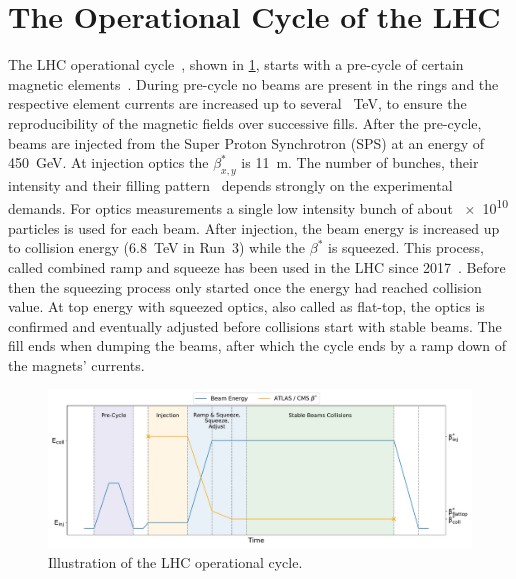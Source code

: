 
\section{The Operational Cycle of the LHC}
\label{section:lhc_operational_cycle}

The LHC operational cycle~\cite{Report:LHCModes}, shown in \cref{figure:lhc_cycle}, starts with a pre-cycle of certain magnetic elements~\cite{Report:LHCMagnetsPreCycles}.
During pre-cycle no beams are present in the rings and the respective element currents are increased up to several \qty{}{\tera\electronvolt}, to ensure the reproducibility of the magnetic fields over successive fills.
After the pre-cycle, beams are injected from the Super Proton Synchrotron (SPS) at an energy of \qty{450}{\giga\electronvolt}.
At injection optics the \(\beta^{\ast}_{x,y}\) is \qty{11}{\metre}.
The number of bunches, their intensity and their filling pattern~\cite{Report:LHCStandardFillingSchemes} depends strongly on the experimental demands.
For optics measurements a single low intensity bunch of about \num{e10} particles is used for each beam.
After injection, the beam energy is increased up to collision energy (\qty{6.8}{\tera\electronvolt} in Run~3) while the \(\beta^{\ast}\) is squeezed.
This process, called combined ramp and squeeze has been used in the LHC since 2017~\cite{IPAC:Camillocci:CombinedRampAndSqueeze}.
Before then the squeezing process only started once the energy had reached collision value.
At top energy with squeezed optics, also called as flat-top, the optics is confirmed and eventually adjusted before collisions start with stable beams.
The fill ends when dumping the beams, after which the cycle ends by a ramp down of the magnets' currents.

\begin{figure}[h]
    \centering
    \includegraphics*[width=0.9\linewidth]{Figures/Chapter3/lhc_cycle.pdf}
    \caption{Illustration of the LHC operational cycle.}
    \label{figure:lhc_cycle}
  \end{figure}


